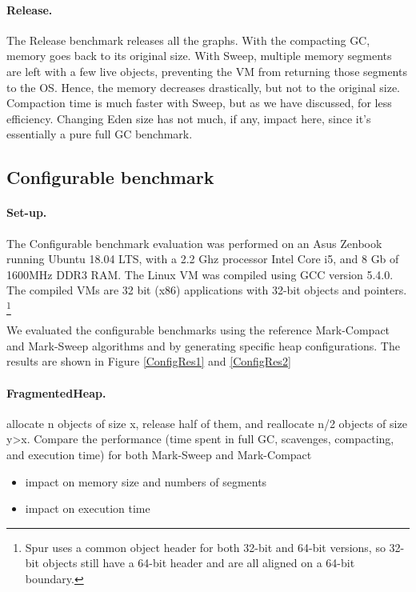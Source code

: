 \documentclass[10pt, sigplan]{acmart}
\begin{document}
\paragraph{Release.} The Release benchmark releases all the graphs. With the compacting GC, memory goes back to its original size. With Sweep, multiple memory segments are left with a few live objects, preventing the VM from returning those segments to the OS. Hence, the memory decreases drastically, but not to the original size. Compaction time is much faster with Sweep, but as we have discussed, for less efficiency. Changing Eden size has not much, if any, impact here, since it's essentially a pure full GC benchmark.

\subsection{Configurable benchmark}



\paragraph{Set-up.}The Configurable benchmark evaluation was performed on an Asus Zenbook running Ubuntu 18.04 LTS, with a 2.2 Ghz processor Intel Core i5, and 8 Gb of 1600MHz DDR3 RAM. The Linux VM was compiled using GCC version 5.4.0. The compiled VMs are 32 bit (x86) applications with 32-bit objects and pointers. \footnote{Spur uses a common object header for both 32-bit and 64-bit versions, so 32-bit objects still have a 64-bit header and are all aligned on a 64-bit boundary.}


We evaluated the configurable benchmarks using the reference Mark-Compact and Mark-Sweep algorithms and by generating specific heap configurations. 
The results are shown in Figure \ref{ConfigRes1} and \ref{ConfigRes2}

\paragraph{FragmentedHeap.} 
allocate n objects of size x, release half of them, and reallocate n/2 objects of size y>x. Compare the performance (time spent in full GC, scavenges, compacting, and execution time) for both Mark-Sweep and Mark-Compact
\begin{itemize}
\item impact on memory size and numbers of segments
\item impact on execution time 
\end{itemize}
\end{document}
